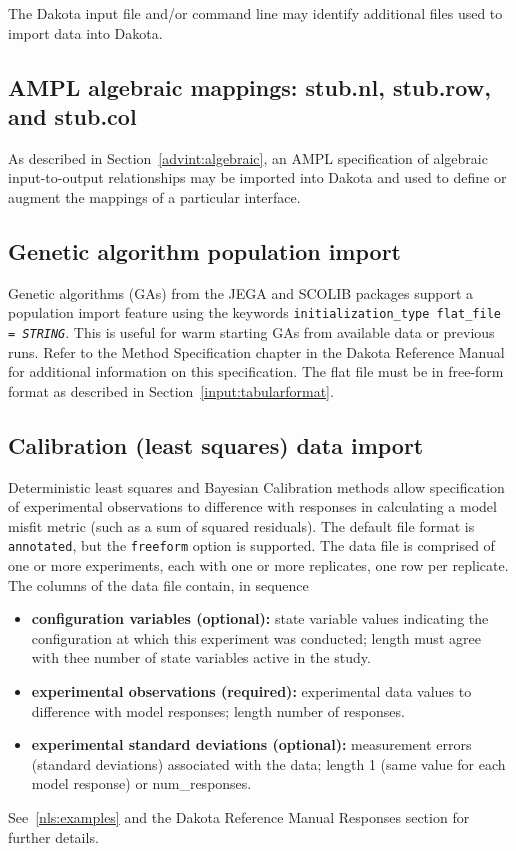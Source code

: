 The Dakota input file and/or command line may identify additional
files used to import data into Dakota.

\subsection{AMPL algebraic mappings: stub.nl, stub.row, and stub.col}

As described in Section~\ref{advint:algebraic}, an AMPL
specification of algebraic input-to-output relationships may be
imported into Dakota and used to define or augment the mappings of a
particular interface.

\subsection{Genetic algorithm population import}

Genetic algorithms (GAs) from the JEGA and SCOLIB packages support a
population import feature using the keywords
\texttt{initialization\_type flat\_file = \emph{STRING}}.  This is
useful for warm starting GAs from available data or previous runs.
Refer to the Method Specification chapter in the Dakota Reference
Manual~\cite{RefMan} for additional information on this specification.
The flat file must be in free-form format as described in
Section~\ref{input:tabularformat}.

\subsection{Calibration (least squares) data import}

Deterministic least squares and Bayesian Calibration methods allow
specification of experimental observations to difference with
responses in calculating a model misfit metric (such as a sum of
squared residuals).  The default file format is {\tt annotated}, but
the {\tt freeform} option is supported.  The data file is comprised of
one or more experiments, each with one or more replicates, one row per
replicate.  The columns of the data file contain, in sequence
\begin{itemize}
\item {\bf configuration variables (optional):} state variable values
  indicating the configuration at which this experiment was conducted;
  length must agree with thee number of state variables active in the
  study.
\item {\bf experimental observations (required):} experimental data
  values to difference with model responses; length number of
  responses.
\item {\bf experimental standard deviations (optional):} measurement
  errors (standard deviations) associated with the data; length 1
  (same value for each model response) or num\_responses.
\end{itemize}
See~\ref{nls:examples} and the Dakota Reference Manual Responses
section for further details.


